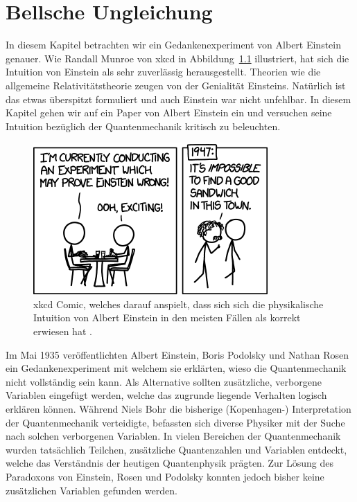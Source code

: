 \chapter{Bellsche Ungleichung\label{chapter:bell}}
\begin{refsection}

In diesem Kapitel betrachten wir ein Gedankenexperiment von Albert Einstein
genauer.
Wie Randall Munroe von xkcd in Abbildung~\ref{fig:bell:xkcd_einstein} illustriert,
hat sich die Intuition von Einstein als sehr zuverl\"assig herausgestellt.
Theorien wie die allgemeine Relativit\"atstheorie zeugen von der Genialit\"at
Einsteins.
Nat\"urlich ist das etwas \"uberspitzt formuliert und auch Einstein war nicht
unfehlbar.
In diesem Kapitel gehen wir auf ein Paper von Albert Einstein ein und versuchen
seine Intuition bez\"uglich der Quantenmechanik kritisch zu beleuchten.

\begin{figure}[b]
    \centering
    \includegraphics[width=0.5\linewidth]{bell/images/xkcd_einstein.png}
    \caption{xkcd Comic, welches darauf anspielt, dass sich sich die
    physikalische Intuition von Albert Einstein in den meisten F\"allen als
    korrekt erwiesen hat \cite{Bell:XkcdEinstein}.}
    \label{fig:bell:xkcd_einstein}
\end{figure}

Im Mai 1935 ver\"offentlichten Albert Einstein, Boris Podolsky und
Nathan Rosen ein Gedankenexperiment mit welchem sie erkl\"arten, wieso
die Quantenmechanik nicht vollst\"andig sein kann. Als Alternative
sollten zus\"atzliche, verborgene Variablen eingef\"ugt werden, welche
das zugrunde liegende Verhalten logisch erkl\"aren k\"onnen.
W\"ahrend Niels Bohr die bisherige (Kopenhagen-) Interpretation der 
Quantenmechanik verteidigte, befassten sich diverse Physiker mit der Suche
nach solchen verborgenen Variablen.
In vielen Bereichen der Quantenmechanik wurden tats\"achlich
Teilchen, zus\"atzliche Quantenzahlen und Variablen entdeckt, welche
das Verst\"andnis der heutigen Quantenphysik pr\"agten.
Zur L\"osung des Paradoxons von Einstein, Rosen und Podolsky konnten
jedoch bisher keine zus\"atzlichen Variablen gefunden werden.


\end{refsection}
